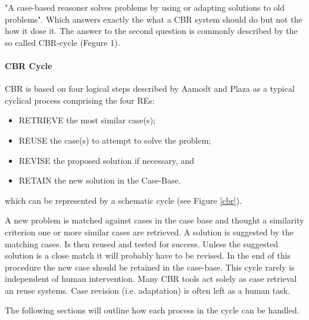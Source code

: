 "A case-based reasoner solves problems by using or adapting solutions to old problems". 
Which answers exactly the what a CBR system should do but not the how it dose it. The answer 
to the second question is commonly described by the so called CBR-cycle (Fegure 1). 
\paragraph{CBR Cycle}
\label{CBR Cycle} CBR is based on four logical steps described by Aamodt and Plaza 
\cite{aamond_plaza_1994} as a typical cyclical process comprising the four REs: 

\begin{itemize}
  \item RETRIEVE the most similar case(s);
  \item REUSE the case(s) to attempt to solve the problem;
  \item REVISE the proposed solution if necessary, and
  \item RETAIN the new solution in the Case-Base.
\end{itemize}
which can be represented by a schematic cycle (see Figure \ref{cbr}).



A new problem is matched against cases in the case base and thought a similarity 
criterion one or more similar cases are retrieved. A solution is suggested by the 
matching cases. Is then reused and tested for success. Unless the suggested solution 
is a close match it will probably have to be revised. In the end of this procedure the 
new case should be retained in the case-base. This cycle rarely is independent of 
human intervention. Many CBR tools act solely as case retrieval an reuse systems. 
Case revision (i.e. adaptation) is often left as a human task.   

The following sections will outline how each process in the cycle can be handled.

